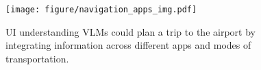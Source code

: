 \begin{figure}[t]

    \centering
    \texttt{[image: figure/navigation\_apps\_img.pdf]}
    \caption{UI understanding VLMs could plan a trip to the airport by integrating information across different apps and modes of transportation.}
\label{fig: navigation apps}
\end{figure}